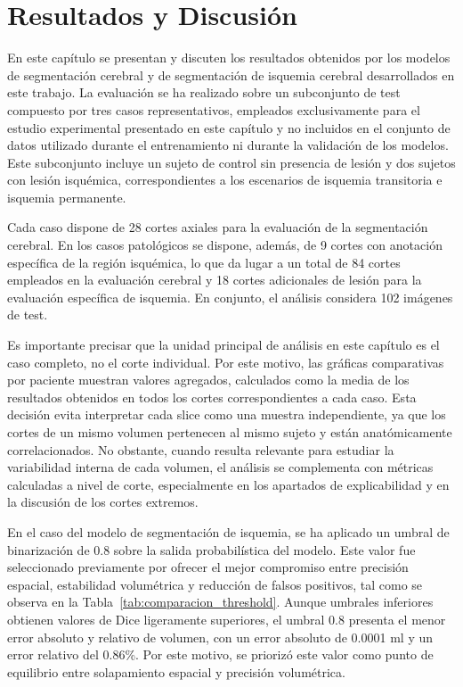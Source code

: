 \chapter{Resultados y Discusión}
\label{cap:Resultados}

En este capítulo se presentan y discuten los resultados obtenidos por los modelos de segmentación cerebral y de segmentación de isquemia cerebral desarrollados en este trabajo. La evaluación se ha realizado sobre un subconjunto de test compuesto por tres casos representativos, empleados exclusivamente para el estudio experimental presentado en este capítulo y no incluidos en el conjunto de datos utilizado durante el entrenamiento ni durante la validación de los modelos. Este subconjunto incluye un sujeto de control sin presencia de lesión y dos sujetos con lesión isquémica, correspondientes a los escenarios de isquemia transitoria e isquemia permanente.

Cada caso dispone de 28 cortes axiales para la evaluación de la segmentación cerebral. En los casos patológicos se dispone, además, de 9 cortes con anotación específica de la región isquémica, lo que da lugar a un total de 84 cortes empleados en la evaluación cerebral y 18 cortes adicionales de lesión para la evaluación específica de isquemia. En conjunto, el análisis considera 102 imágenes de test.

Es importante precisar que la unidad principal de análisis en este capítulo es el caso completo, no el corte individual. Por este motivo, las gráficas comparativas por paciente muestran valores agregados, calculados como la media de los resultados obtenidos en todos los cortes correspondientes a cada caso. Esta decisión evita interpretar cada slice como una muestra independiente, ya que los cortes de un mismo volumen pertenecen al mismo sujeto y están anatómicamente correlacionados. No obstante, cuando resulta relevante para estudiar la variabilidad interna de cada volumen, el análisis se complementa con métricas calculadas a nivel de corte, especialmente en los apartados de explicabilidad y en la discusión de los cortes extremos.

En el caso del modelo de segmentación de isquemia, se ha aplicado un umbral de binarización de 0.8 sobre la salida probabilística del modelo. Este valor fue seleccionado previamente por ofrecer el mejor compromiso entre precisión espacial, estabilidad volumétrica y reducción de falsos positivos, tal como se observa en la Tabla~\ref{tab:comparacion_threshold}. Aunque umbrales inferiores obtienen valores de Dice ligeramente superiores, el umbral 0.8 presenta el menor error absoluto y relativo de volumen, con un error absoluto de 0.0001 ml y un error relativo del 0.86\%. Por este motivo, se priorizó este valor como punto de equilibrio entre solapamiento espacial y precisión volumétrica. 

